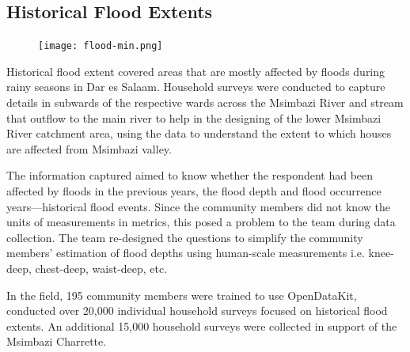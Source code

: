 \documentclass[a4paper,12pt,twoside]{article}
\begin{document}
\newpage
\subsection{Historical Flood Extents}
\begin{figure}[h]
    \centering
    \texttt{[image: flood-min.png]}
    \label{fig:my_label}
\end{figure}

\begin{multicols}{2}
Historical flood extent covered areas that are mostly affected by floods during rainy seasons in Dar es Salaam. Household surveys were conducted to capture details in subwards of the respective wards across the Msimbazi River and stream that outflow to the main river to help in the designing of the lower Msimbazi River catchment area, using the data to understand the extent to which houses are affected from Msimbazi valley.

The information captured aimed to know whether the respondent had been affected by floods in the previous years, the flood depth and flood occurrence years---historical flood events. Since the community members did not know the units of measurements in metrics, this posed a problem to the team during data collection. The team re-designed the questions to simplify the community members’ estimation of flood depths using human-scale measurements i.e. knee-deep, chest-deep, waist-deep, etc.

In the field, 195 community members were trained to use OpenDataKit, conducted over 20,000 individual household surveys focused on historical flood extents. An additional 15,000 household surveys were collected in support of the Msimbazi Charrette. 
\end{multicols}

\newpage
\end{document}

